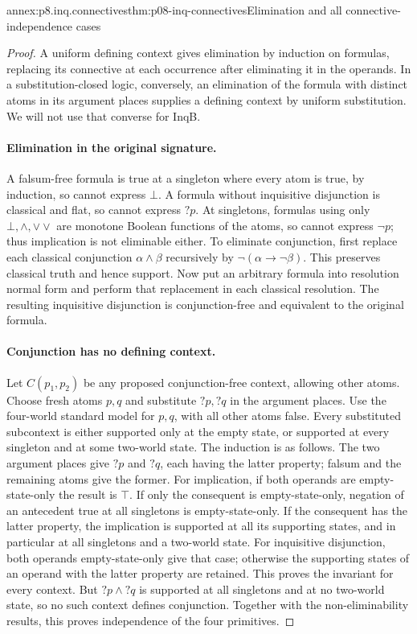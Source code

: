 \begin{annexitem}{annex:p8.inq.connectives}{thm:p08-inq-connectives}{Elimination and all connective-independence cases}
\begin{proof}
A uniform defining context gives elimination by induction on formulas,
replacing its connective at each occurrence after eliminating it in the
operands. In a substitution-closed logic, conversely, an elimination of
the formula with distinct atoms in its argument places supplies a defining
context by uniform substitution. We will not use that converse for InqB.

\paragraph{Elimination in the original signature.}
A falsum-free formula is true at a singleton where every atom is true,
by induction, so cannot express \(\bot\). A formula without inquisitive
disjunction is classical and flat, so cannot express \(?p\). At singletons,
formulas using only \(\bot,\land,\mathbin{\vee\!\vee}\) are monotone
Boolean functions of the atoms, so cannot express \(\neg p\); thus
implication is not eliminable either.
To eliminate conjunction, first replace each classical conjunction
\(\alpha\land\beta\) recursively by \(\neg(\alpha\to\neg\beta)\).
This preserves classical truth and hence support. Now put an arbitrary
formula into resolution normal form and perform that replacement in
each classical resolution. The resulting inquisitive disjunction is
conjunction-free and equivalent to the original formula.

\paragraph{Conjunction has no defining context.}
Let \(C(p_1,p_2)\) be any proposed conjunction-free context, allowing
other atoms. Choose fresh atoms \(p,q\) and substitute \(?p,?q\) in
the argument places. Use the four-world standard model for \(p,q\),
with all other atoms false. Every substituted subcontext is either
supported only at the empty state, or supported at every singleton and
at some two-world state. The induction is as follows. The two argument
places give \(?p\) and \(?q\), each having the latter property; falsum
and the remaining atoms give the former. For implication, if both
operands are empty-state-only the result is \(\top\). If only the
consequent is empty-state-only, negation of an antecedent true at all
singletons is empty-state-only. If the consequent has the latter
property, the implication is supported at all its supporting states,
and in particular at all singletons and a two-world state. For
inquisitive disjunction, both operands empty-state-only give that case;
otherwise the supporting states of an operand with the latter property
are retained. This proves the invariant for every context. But
\(?p\land?q\) is supported at all singletons and at no two-world
state, so no such context defines conjunction. Together with the
non-eliminability results, this proves independence of the four primitives.


\end{proof}
\end{annexitem}
